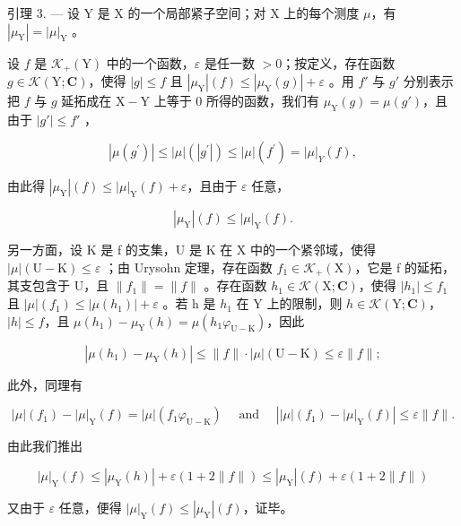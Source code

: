 引理 3. --- 设 Y 是 X 的一个局部紧子空间；对 X 上的每个测度 \(\mu\)，有 \(|\mu_{\mathrm{Y}}| = |\mu|_{\mathrm{Y}}\) 。

设 \(f\) 是 \(\mathcal{K}_{+}(\mathrm{Y})\) 中的一个函数，\(\varepsilon\) 是任一数 \(>0\)；按定义，存在函数 \(g \in \mathcal{K}(\mathrm{Y};\mathbf{C})\)，使得 \(|g| \leqslant f\) 且 \(|\mu_{\mathrm{Y}}|(f) \leqslant |\mu_{\mathrm{Y}}(g)| + \varepsilon\) 。用 \(f'\) 与 \(g'\) 分别表示把 \(f\) 与 \(g\) 延拓成在 \(\mathrm{X} - \mathrm{Y}\) 上等于 0 所得的函数，我们有 \(\mu_{\mathrm{Y}}(g) = \mu(g')\)，且由于 \(|g'| \leqslant f'\) ，

\[
\left| \mu \left(g ^ {\prime}\right) \right| \leqslant | \mu | \left(\left| g ^ {\prime} \right|\right) \leqslant | \mu | \left(f ^ {\prime}\right) = | \mu | _ {Y} (f),
\]

由此得 \(|\mu_{\mathrm{Y}}|(f)\leqslant |\mu |_{\mathrm{Y}}(f) + \varepsilon\)，且由于 \(\varepsilon\) 任意，

\[
| \mu_ {\mathrm{Y}} | (f) \leqslant | \mu | _ {\mathrm{Y}} (f).
\]

另一方面，设 K 是 f 的支集，U 是 K 在 X 中的一个紧邻域，使得 \(|\mu|(\mathrm{U}-\mathrm{K}) \leqslant \varepsilon\) ；由 Urysohn 定理，存在函数 \(f_{1} \in \mathcal{K}_{+}(\mathrm{X})\)，它是 f 的延拓，其支包含于 U，且 \(\|f_{1}\| = \|f\|\) 。存在函数 \(h_{1} \in \mathcal{K}(\mathrm{X}; \mathbf{C})\)，使得 \(|h_{1}| \leqslant f_{1}\) 且 \(|\mu|(f_{1}) \leqslant |\mu(h_{1})| + \varepsilon\) 。若 h 是 \(h_{1}\) 在 Y 上的限制，则 \(h \in \mathcal{K}(\mathrm{Y}; \mathbf{C})\)，\(|h| \leqslant f\)，且 \(\mu(h_{1}) - \mu_{\mathrm{Y}}(h) = \mu(h_{1}\varphi_{\mathrm{U}-\mathrm{K}})\)，因此

\[
\left| \mu \left(h _ {1}\right) - \mu_ {\mathrm{Y}} (h) \right| \leqslant \| f \| \cdot | \mu | (\mathrm{U} - \mathrm{K}) \leqslant \varepsilon \| f \|;
\]

此外，同理有

\[
| \mu | (f _ {1}) - | \mu | _ {\mathrm{Y}} (f) = | \mu | (f _ {1} \varphi_ {\mathrm{U} - \mathrm{K}}) \quad \text { and } \quad \left| | \mu | (f _ {1}) - | \mu | _ {\mathrm{Y}} (f) \right| \leqslant \varepsilon \| f \|.
\]

由此我们推出

\[
| \mu | _ {\mathrm{Y}} (f) \leqslant | \mu_ {\mathrm{Y}} (h) | + \varepsilon (1 + 2 \| f \|) \leqslant | \mu_ {\mathrm{Y}} | (f) + \varepsilon (1 + 2 \| f \|)
\]

又由于 \(\varepsilon\) 任意，便得 \(|\mu|_{\mathrm{Y}}(f) \leqslant |\mu_{\mathrm{Y}}|(f)\)，证毕。

